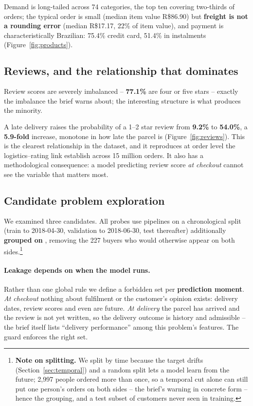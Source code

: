 Demand is long-tailed across 74 categories, the top ten covering two-thirds of
orders; the typical order is small (median item value R\$86.90) but
\textbf{freight is not a rounding error} (median R\$17.17, 22\% of item value),
and payment is characteristically Brazilian: 75.4\% credit card, 51.4\% in
instalments (Figure~\ref{fig:products}).

\subsection{Reviews, and the relationship that dominates}
\label{sec:reviews}

Review scores are severely imbalanced -- \textbf{77.1\%} are four or five stars --
exactly the imbalance the brief warns about; the interesting structure is what
produces the minority.

A late delivery raises the probability of a 1--2 star review from \textbf{9.2\%}
to \textbf{54.0\%}, a \textbf{5.9-fold} increase, monotone in how late the parcel
is (Figure~\ref{fig:reviews}). This is the clearest relationship in the dataset,
and it reproduces at order level the logistics--rating link
\citet{deshpande2023logistics} establish across 15 million orders. It also has a
methodological consequence: a model predicting review score \emph{at checkout}
cannot see the variable that matters most.

\subsection{Candidate problem exploration}
\label{sec:candidates}

We examined three candidates. All probes use  pipelines on a
chronological split (train to 2018-04-30, validation to 2018-06-30, test
thereafter) additionally \textbf{grouped on }, removing
the 227 buyers who would otherwise appear on both sides.\footnote{\textbf{Note on
splitting.} We split by time because the target drifts (Section~\ref{sec:temporal})
and a random split lets a model learn from the future; 2{,}997 people ordered more
than once, so a temporal cut alone can still put one person's orders on both sides
-- the brief's  warning in concrete form -- hence the grouping,
and a test subset of customers never seen in training.}

\paragraph{Leakage depends on when the model runs.}
Rather than one global rule we define a forbidden set per \textbf{prediction
moment}. \emph{At checkout} nothing about fulfilment or the customer's opinion
exists: delivery dates, review scores and even  are
future. \emph{At delivery} the parcel has arrived and the review is not yet
written, so the delivery outcome is history and admissible -- the brief itself
lists ``delivery performance'' among this problem's features. The guard
 enforces the right set.

